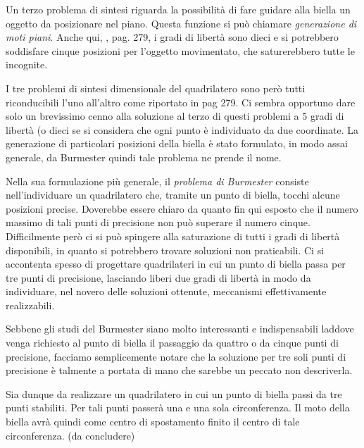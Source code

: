 \noindent Un terzo problema di sintesi riguarda la possibilit\`a di fare guidare alla
biella un oggetto da posizionare nel piano. Questa funzione si pu\`o chiamare 
{\em generazione di moti piani}. Anche qui, 
\cite{ruggieri}, pag. 279, i gradi di libert\`a sono dieci e si potrebbero soddisfare
cinque posizioni per l'oggetto movimentato, che saturerebbero tutte le incognite.

\noindent I tre problemi di sintesi dimensionale del quadrilatero sono per\`o tutti
riconducibili l'uno all'altro come riportato in \cite{ruggieri} pag 279.
Ci sembra opportuno dare solo un brevissimo cenno alla soluzione al terzo di questi
problemi a 5 gradi di libert\`a (o dieci se si considera che ogni punto \`e individuato
da due coordinate. La generazione di particolari posizioni della biella \`e stato
formulato, in modo assai generale, da Burmester quindi tale problema ne prende il
nome.

\noindent Nella sua formulazione pi\`u generale, il {\em problema di Burmester}
consiste nell'individuare un quadrilatero che,  tramite un punto di biella, tocchi
alcune posizioni precise.
Doverebbe essere chiaro da quanto fin qui esposto che il numero massimo di tali punti
di precisione non pu\`o superare il numero cinque. 
Difficilmente per\`o ci si pu\`o spingere alla saturazione di tutti i gradi di
libert\`a disponibili, in quanto si potrebbero trovare soluzioni non praticabili.
Ci si accontenta spesso di progettare quadrilateri in cui un punto di biella 
passa per tre punti di precisione, lasciando liberi due gradi di libert\`a in modo
da individuare, nel novero delle soluzioni ottenute,
meccanismi effettivamente realizzabili.

\noindent Sebbene gli studi del Burmester siano molto interessanti e
indispensabili laddove venga
richiesto al punto di biella il passaggio da quattro o da cinque punti di
precisione,
facciamo semplicemente notare che la soluzione per tre soli punti di precisione
\`e talmente a portata di mano che sarebbe un peccato non descriverla.

\noindent Sia dunque da realizzare un quadrilatero in cui un punto di biella
passi da tre punti stabiliti. Per tali punti passer\`a una e una sola circonferenza.
Il moto della biella avr\`a quindi come centro di spostamento finito il centro
di tale circonferenza.
(da concludere)

